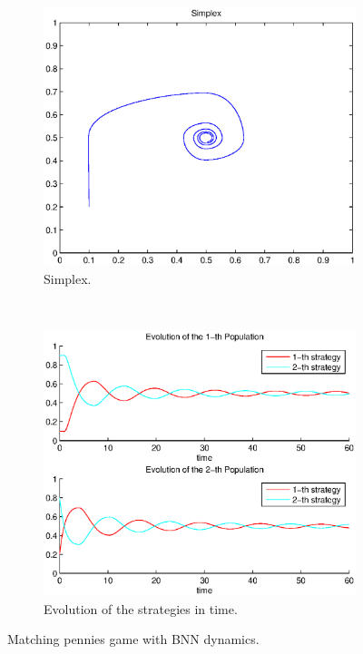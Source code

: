 \documentclass[a4paper,10pt]{article}
\begin{document}
\begin{figure}
  \centering
  \begin{subfigure}[b]{0.45\textwidth}
	  \includegraphics[width=\textwidth]{./images/test2_simplex_bnn.eps}
	  \caption{Simplex.}
	  \label{fig:test2_simplex_bnn}
  \end{subfigure}
  ~ 
  \begin{subfigure}[b]{0.45\textwidth}
	  \includegraphics[width=\textwidth]{./images/test2_ev_bnn.eps}
	  \caption{Evolution of the strategies in time.}
	  \label{fig:test2_ev_bnn}
  \end{subfigure}
  \caption{Matching pennies game with BNN dynamics.}
  \label{fig:mp_game_bnn}
\end{figure}
\end{document}
